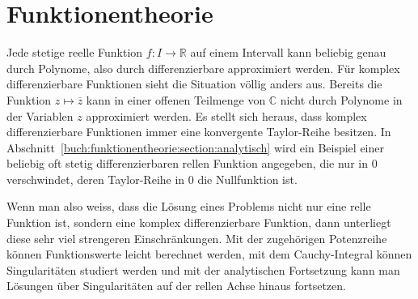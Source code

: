 %
%
%
\chapter{Funktionentheorie
\label{buch:chapter:funktionentheorie}}
\rhead{}
Jede stetige reelle Funktion $f\colon I\to\mathbb{R}$ auf einem
Intervall kann beliebig genau durch Polynome, also durch
differenzierbare approximiert werden.
Für komplex differenzierbare Funktionen sieht die Situation
völlig anders aus.
Bereits die Funktion $z\mapsto \overline{z}$ kann in einer offenen
Teilmenge von $\mathbb{C}$ nicht durch Polynome in der Variablen $z$
approximiert werden.
Es stellt sich heraus, dass komplex differenzierbare Funktionen
immer eine konvergente Taylor-Reihe besitzen.
In Abschnitt~\ref{buch:funktionentheorie:section:analytisch} wird
ein Beispiel einer beliebig oft stetig differenzierbaren rellen
Funktion angegeben, die nur in $0$ verschwindet, deren Taylor-Reihe
in $0$ die Nullfunktion ist.

Wenn man also weiss, dass die Lösung eines Problems nicht nur eine
relle Funktion ist, sondern eine komplex differenzierbare Funktion,
dann unterliegt diese sehr viel strengeren Einschränkungen.
Mit der zugehörigen Potenzreihe können Funktionswerte leicht berechnet
werden, mit dem Cauchy-Integral können Singularitäten studiert werden
und mit der analytischen Fortsetzung kann man Lösungen über Singularitäten
auf der rellen Achse hinaus fortsetzen.








